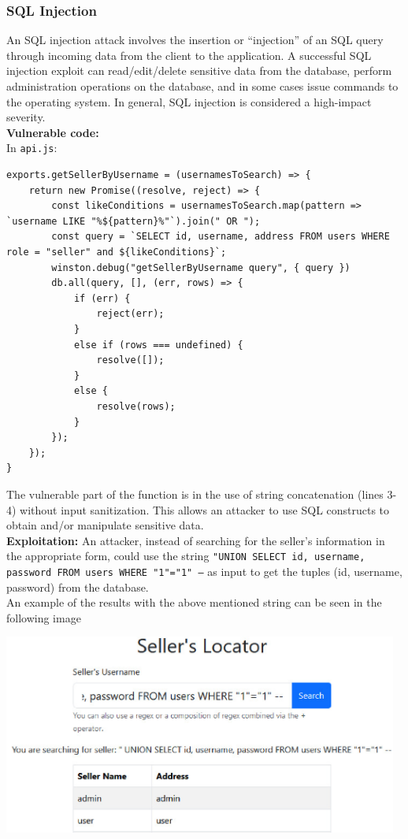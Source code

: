 \documentclass[]{article}
\begin{document}
\subsubsection{SQL Injection}
An SQL injection attack involves the insertion or “injection” of an SQL query through incoming data from the client to the application. A successful SQL injection exploit can read/edit/delete sensitive data from the database, perform administration operations on the database, and in some cases issue commands to the operating system. In general, SQL injection is considered a high-impact severity.
\\ \textbf{Vulnerable code:} \\
In \texttt{api.js}: 
\begin{lstlisting}
exports.getSellerByUsername = (usernamesToSearch) => {
	return new Promise((resolve, reject) => {
		const likeConditions = usernamesToSearch.map(pattern => `username LIKE "%${pattern}%"`).join(" OR ");
		const query = `SELECT id, username, address FROM users WHERE role = "seller" and ${likeConditions}`;
		winston.debug("getSellerByUsername query", { query })
		db.all(query, [], (err, rows) => {
			if (err) {
				reject(err);
			}
			else if (rows === undefined) {
				resolve([]);
			}
			else {
				resolve(rows);
			}
		});
	});
}
\end{lstlisting}
The vulnerable part of the function is in the use of string concatenation (lines 3-4) without input sanitization. This allows an attacker to use SQL constructs to obtain and/or manipulate sensitive data. \\ 
\textbf{Exploitation:} An attacker, instead of searching for the seller's information in the appropriate form, could use the string \texttt{"UNION SELECT id, username, password FROM users WHERE "1"="1" --} as input to get the tuples (id, username, password) from the database. \\
An example of the results with the above mentioned string can be seen in the following image
\begin{center} \includegraphics[width=13cm]{images/sql_inj.eps} 
\end{center}
\end{document}
